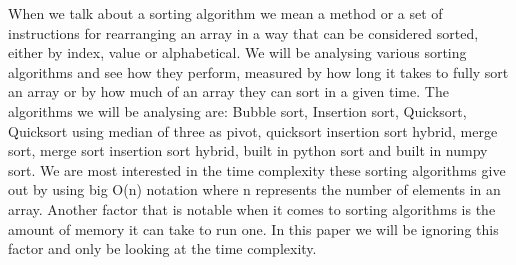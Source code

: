 
When we talk about a sorting algorithm we mean a method or a set of instructions for rearranging an array in a way that can be considered sorted, either by index, value or alphabetical. We will be analysing various sorting algorithms and see how they perform, measured by how long it takes to fully sort an array or by how much of an array they can sort in a given time.
The algorithms we will be analysing are: Bubble sort, Insertion sort, Quicksort, Quicksort using median of three as pivot, quicksort insertion sort hybrid, merge sort, merge sort insertion sort hybrid, built in python sort and built in numpy sort.
We are most interested in the time complexity these sorting algorithms give out by using big O(n) notation where n represents the number of elements in an array. Another factor that is notable when it comes to sorting algorithms is the amount of memory it can take to run one. In this paper we will be ignoring this factor and only be looking at the time complexity.
